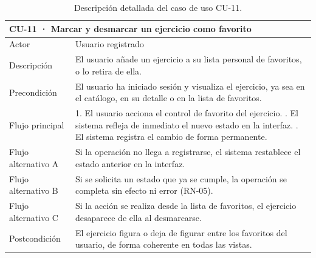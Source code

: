\documentclass[12pt,a4paper,twoside,openright]{book}
\begin{document}
    \begin{table}[htbp]
        \centering
        \small
        \begin{tabular}{p{2.7cm} p{9.8cm}}
            \toprule
            \multicolumn{2}{l}{\textbf{CU-11 · Marcar y desmarcar un ejercicio como favorito}} \\
            \midrule
            Actor & Usuario registrado \\
            Descripción & El usuario añade un ejercicio a su lista personal de favoritos, o lo retira de ella. \\
            Precondición & El usuario ha iniciado sesión y visualiza el ejercicio, ya sea en el catálogo, en su detalle o en la lista de favoritos. \\
            Flujo principal & 1. El usuario acciona el control de favorito del ejercicio. \newline
                              2. El sistema refleja de inmediato el nuevo estado en la interfaz. \newline
                              3. El sistema registra el cambio de forma permanente. \\
            Flujo alternativo A & Si la operación no llega a registrarse, el sistema restablece el estado anterior en la interfaz. \\
            Flujo alternativo B & Si se solicita un estado que ya se cumple, la operación se completa sin efecto ni error (RN-05). \\
            Flujo alternativo C & Si la acción se realiza desde la lista de favoritos, el ejercicio desaparece de ella al desmarcarse. \\
            Postcondición & El ejercicio figura o deja de figurar entre los favoritos del usuario, de forma coherente en todas las vistas. \\
            \bottomrule
        \end{tabular}
        \caption{Descripción detallada del caso de uso CU-11.}
        \label{tab:cu-11}
    \end{table}
\end{document}

